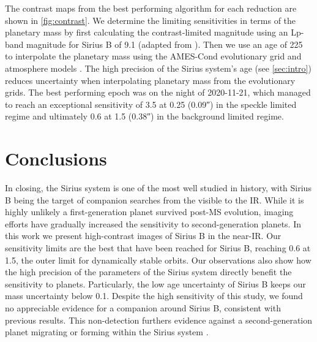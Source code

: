\documentclass[twocolumn]{aastex631}
\begin{document}
The contrast maps from the best performing algorithm for each reduction are shown in \autoref{fig:contrast}. We determine the limiting sensitivities in terms of the planetary mass by first calculating the contrast-limited magnitude using an Lp-band magnitude for Sirius B of 9.1 (adapted from \citealp{bonnet-bidaud_adonis_2008}). Then we use an age of \qty{225}{\mega\year} to interpolate the planetary mass using the AMES-Cond evolutionary grid and atmosphere models \citep{allard_models_2012}. The high precision of the Sirius system's age (see \autoref{sec:intro}) reduces uncertainty when interpolating planetary mass from the evolutionary grids. The best performing epoch was on the night of 2020-11-21, which managed to reach an exceptional sensitivity of \qty{3.5}{\jupitermass} at \qty{0.25}{\au} (\ang{;;0.09}) in the speckle limited regime and ultimately \qty{0.6}{\jupitermass} at \qty{1.5}{\au} (\ang{;;0.38}) in the background limited regime.

\section{Conclusions} \label{sec:conclusion}

In closing, the Sirius system is one of the most well studied in history, with Sirius B being the target of companion searches from the visible to the IR. While it is highly unlikely a first-generation planet survived post-MS evolution, imaging efforts have gradually increased the sensitivity to second-generation planets. In this work we present high-contrast images of Sirius B in the near-IR. Our sensitivity limits are the best that have been reached for Sirius B, reaching \qty{0.6}{\jupitermass} at \qty{1.5}{\au}, the outer limit for dynamically stable orbits. Our observations also show how the high precision of the parameters of the Sirius system directly benefit the sensitivity to planets. Particularly, the low age uncertainty of Sirius B keeps our mass uncertainty below \qty{0.1}{\jupitermass}. Despite the high sensitivity of this study, we found no appreciable evidence for a companion around Sirius B, consistent with previous results. This non-detection furthers evidence against a second-generation planet migrating or forming within the Sirius system \citep{vigan_high-contrast_2015}.
\end{document}
